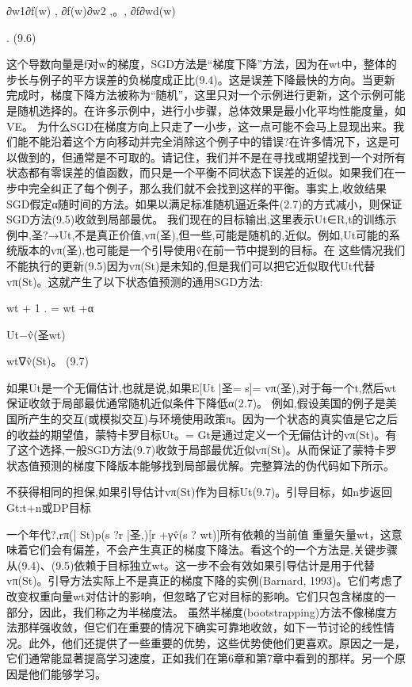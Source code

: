 ∂w1∂f(w)
,
∂f(w)∂w2
,。,
∂f∂wd(w)

. 					(9.6)

这个导数向量是f对w的梯度，SGD方法是“梯度下降”方法，因为在wt中，整体的步长与例子的平方误差的负梯度成正比(9.4)。这是误差下降最快的方向。当更新完成时，梯度下降方法被称为“随机”，这里只对一个示例进行更新，这个示例可能是随机选择的。在许多示例中，进行小步骤，总体效果是最小化平均性能度量，如VE。
为什么SGD在梯度方向上只走了一小步，这一点可能不会马上显现出来。我们能不能沿着这个方向移动并完全消除这个例子中的错误?在许多情况下，这是可以做到的，但通常是不可取的。请记住，我们并不是在寻找或期望找到一个对所有状态都有零误差的值函数，而只是一个平衡不同状态下误差的近似。如果我们在一步中完全纠正了每个例子，那么我们就不会找到这样的平衡。事实上,收敛结果SGD假定α随时间的方法。如果以满足标准随机逼近条件(2.7)的方式减小，则保证SGD方法(9.5)收敛到局部最优。
我们现在的目标输出,这里表示Ut∈R,t的训练示例中,圣?→Ut,不是真正价值,vπ(圣),但一些,可能是随机的,近似。例如,Ut可能的系统版本的vπ(圣),也可能是一个引导使用v̂在前一节中提到的目标。在
这些情况我们不能执行的更新(9.5)因为vπ(St)是未知的,但是我们可以把它近似取代Ut代替vπ(St)。这就产生了以下状态值预测的通用SGD方法:


wt + 1
.
= wt +α

Ut−v̂(圣wt)

wt∇v̂(St)。 					(9.7)

如果Ut是一个无偏估计,也就是说,如果E[Ut |圣= s]= vπ(圣),对于每一个t,然后wt保证收敛于局部最优通常随机近似条件下降低α(2.7)。
例如,假设美国的例子是美国所产生的交互(或模拟交互)与环境使用政策π。因为一个状态的真实值是它之后的收益的期望值，蒙特卡罗目标Ut。= Gt是通过定义一个无偏估计的vπ(St)。有了这个选择,一般SGD方法(9.7)收敛于局部最优近似vπ(St)。从而保证了蒙特卡罗状态值预测的梯度下降版本能够找到局部最优解。完整算法的伪代码如下所示。
 

不获得相同的担保,如果引导估计vπ(St)作为目标Ut(9.7)。引导目标，如n步返回Gt:t+n或DP目标

一个年代?,rπ(| St)p(s ?r |圣,)[r +γv̂(s ? wt)]所有依赖的当前值
重量矢量wt，这意味着它们会有偏差，不会产生真正的梯度下降法。看这个的一个方法是,关键步骤从(9.4)、(9.5)依赖于目标独立wt。这一步不会有效如果引导估计是用于代替vπ(St)。引导方法实际上不是真正的梯度下降的实例(Barnard, 1993)。它们考虑了改变权重向量wt对估计的影响，但忽略了它对目标的影响。它们只包含梯度的一部分，因此，我们称之为半梯度法。
虽然半梯度(bootstrapping)方法不像梯度方法那样强收敛，但它们在重要的情况下确实可靠地收敛，如下一节讨论的线性情况。此外，他们还提供了一些重要的优势，这些优势使他们更喜欢。原因之一是，它们通常能显著提高学习速度，正如我们在第6章和第7章中看到的那样。另一个原因是他们能够学习。

